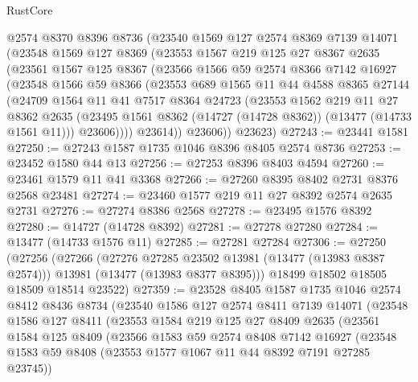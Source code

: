 \begin{lexlean}{RustCore}
\begin{coremodule}
    @2574
    @8370
    @8396
    @8736
    (@23540
      @1569
      @127
      @2574
      @8369
      @7139
      @14071
      (@23548
        @1569
        @127
        @8369
        (@23553
          @1567
          @219
          @125
          @27
          @8367
          @2635
          (@23561
            @1567
            @125
            @8367
            (@23566
              @1566
              @59
              @2574
              @8366
              @7142
              @16927
              (@23548
                @1566
                @59
                @8366
                (@23553
                  @689
                  @1565
                  @11
                  @44
                  @4588
                  @8365
                  @27144
                  (@24709
                    @1564
                    @11
                    @41
                    @7517
                    @8364
                    @24723
                    (@23553
                      @1562
                      @219
                      @11
                      @27
                      @8362
                      @2635
                      (@23495 @1561 @8362 (@14727 (@14728 @8362)) (@13477 (@14733 @1561 @11)))
                      @23606))))
              @23614))
          @23606))
      @23623)
@27243 := @23441 @1581
@27250 := @27243 @1587 @1735 @1046 @8396 @8405 @2574 @8736
@27253 := @23452 @1580 @44 @13
@27256 := @27253 @8396 @8403 @4594
@27260 := @23461 @1579 @11 @41 @3368
@27266 := @27260 @8395 @8402 @2731 @8376 @2568 @23481
@27274 := @23460 @1577 @219 @11 @27 @8392 @2574 @2635 @2731
@27276 := @27274 @8386 @2568
@27278 := @23495 @1576 @8392
@27280 := @14727 (@14728 @8392)
@27281 := @27278 @27280
@27284 := @13477 (@14733 @1576 @11)
@27285 := @27281 @27284
@27306 := @27250
    (@27256
      (@27266
        (@27276 @27285 @23502 @13981 (@13477 (@13983 @8387 @2574)))
        @13981
        (@13477 (@13983 @8377 @8395)))
      @18499
      @18502
      @18505
      @18509
      @18514
      @23522)
@27359 := @23528
    @8405
    @1587
    @1735
    @1046
    @2574
    @8412
    @8436
    @8734
    (@23540
      @1586
      @127
      @2574
      @8411
      @7139
      @14071
      (@23548
        @1586
        @127
        @8411
        (@23553
          @1584
          @219
          @125
          @27
          @8409
          @2635
          (@23561
            @1584
            @125
            @8409
            (@23566
              @1583
              @59
              @2574
              @8408
              @7142
              @16927
              (@23548 @1583 @59 @8408 (@23553 @1577 @1067 @11 @44 @8392 @7191 @27285 @23745))

\end{coremodule}
\end{lexlean}
